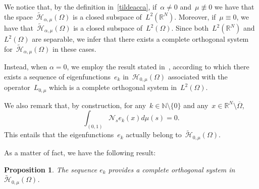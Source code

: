 \documentclass[12pt,a4paper,intlimits,sumlimits]{amsart}
\def \N {\mathbb{N}}
\def \R {\mathbb{R}}
\def \Ns {\mathscr{N}_{s}}
\theoremstyle{definition}
\theoremstyle{plain}
\newtheorem{proposition}[definition]{Proposition}
\numberwithin{equation}{section}
\begin{document}
We notice that, by the definition in~\eqref{tildeacca},
if~$\alpha\neq 0$ and~$\mu\not\equiv 0$ we have that the space~$\widetilde{\mathcal H}_{\alpha, \mu}(\Omega)$ is a closed subspace of~$L^2(\R^N)$. Moreover, if~$\mu\equiv 0$, we have that~$\widetilde{\mathcal H}_{\alpha, \mu}(\Omega)$ is a closed subspace of~$L^2(\Omega)$.
Since both~$L^2(\R^N)$ and~$L^2(\Omega)$ are separable, we infer that there exists a complete orthogonal system for~$\widetilde{\mathcal H}_{\alpha, \mu}(\Omega)$ in these cases.

Instead, when $\alpha=0$, we employ the result stated in~\cite[Theorem~1.5]{TUTTI}, according to which there exists a sequence of eigenfunctions~$e_k$ in~${\mathcal H}_{0, \mu}(\Omega)$ associated with the operator~$L_{0,\mu}$ which is a complete orthogonal system in~$L^2(\Omega)$. 

We also remark that, by construction, for any~$k\in\N\setminus\{0\}$
and any~$x\in\R^N\setminus \overline\Omega$,
\begin{equation}\label{dhuwo4ty4tgufkjfbewksbefi4yoi}
\int_{(0, 1)}\Ns e_k(x) d\mu(s) =0.
\end{equation}
This entails that the eigenfunctions~$e_k$ actually
belong to~$\widetilde{\mathcal H}_{0, \mu}(\Omega)$.

As a matter of fact, we have the following result:

\begin{proposition}\label{sistemacompleto}
The sequence $e_k$ provides a complete orthogonal system in $\widetilde{\mathcal H}_{0, \mu}(\Omega)$.
\end{proposition}
\end{document}
